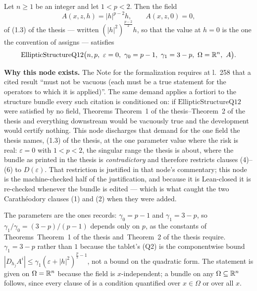 \begin{lemma}[The model field of (1.3) of the thesis inhabits (Q1) of the thesis--(Q2) of the thesis at $\varepsilon=0$ on $1<p<2$]
Let $n\ge1$ be an integer and let $1<p<2$.  Then the field
\[
A(x,z,h)=|h|^{p-2}h ,\qquad A(x,z,0)=0 ,
\]
of (1.3) of the thesis --- written $(|h|^2)^{\frac{p-2}2}h$, so that the value at
$h=0$ is the one the convention of  assigns ---
satisfies
\[
\mathrm{EllipticStructureQ12}\bigl(n,p,\ \varepsilon=0,\ \gamma_0=p-1,\
\gamma_1=3-p,\ \Omega=\R^n,\ A\bigr).
\]

\noindent\textbf{Why this node exists.}  The Note for the formalization requires
at l.~258 that a cited result ``must not be vacuous (each must be a true
statement for the operators to which it is applied)''.  The same demand applies
a fortiori to the structure bundle every such citation is conditioned on: if
$\mathrm{EllipticStructureQ12}$ were satisfied by no field, Theorems
Theorem~1 of the thesis--Theorem~2 of the thesis and everything downstream would be vacuously true and
the development would certify nothing.  This node discharges that demand for the
one field the thesis names, (1.3) of the thesis, at the one parameter value where the
risk is real: $\varepsilon=0$ with $1<p<2$, the singular range the thesis is
about, where the bundle as printed in the thesis is \emph{contradictory} and
\noderef{EllipticStructureQ12} therefore restricts clauses (4)--(6) to
$D(\varepsilon)$.  That restriction is justified in that node's commentary; this
node is the machine-checked half of the justification, and because it is
Lean-closed it is re-checked whenever the bundle is edited --- which is what
caught the two Carath\'eodory clauses (1) and (2) when they were added.

The parameters are the ones  records:
$\gamma_0=p-1$ and $\gamma_1=3-p$, so $\gamma_1/\gamma_0=(3-p)/(p-1)$ depends
only on $p$, as the constants of Theorems~Theorem~1 of the thesis and~Theorem~2 of the thesis require.
$\gamma_1=3-p$ rather than $1$ because the tablet's (Q2) is the componentwise
bound $|D_{h_j}A^i|\le\gamma_1(\varepsilon+|h|^2)^{\frac p2-1}$, not a bound on
the quadratic form.  The statement is given on $\Omega=\mathbb{R}^n$ because the field
is $x$-independent; a bundle on any $\Omega\subseteq\mathbb{R}^n$ follows, since every
clause of \noderef{EllipticStructureQ12} is a condition quantified over
$x\in\Omega$ or over all $x$.
\end{lemma}
